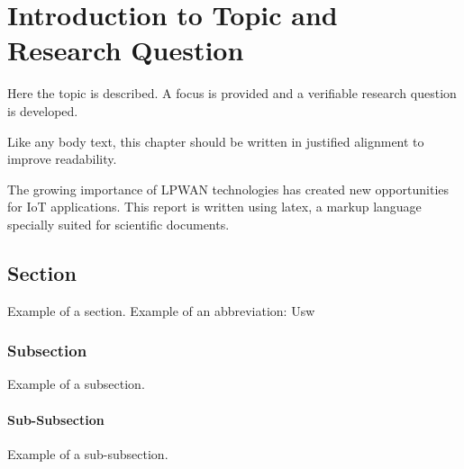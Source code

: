 %

\chapter{Introduction to Topic and Research Question}


Here the topic is described. A focus is provided and a verifiable research question is developed.

Like any body text, this chapter should be written in justified alignment to improve readability.

The growing importance of \gls{LPWAN} technologies has created new opportunities for IoT applications. This report is written using \gls{latex}, a markup language specially suited for scientific documents.


\section{Section}

Example of a section. \newline
Example of an abbreviation: \gls{Usw}

\subsection{Subsection}

Example of a subsection.

\subsubsection{Sub-Subsection}
Example of a sub-subsection.